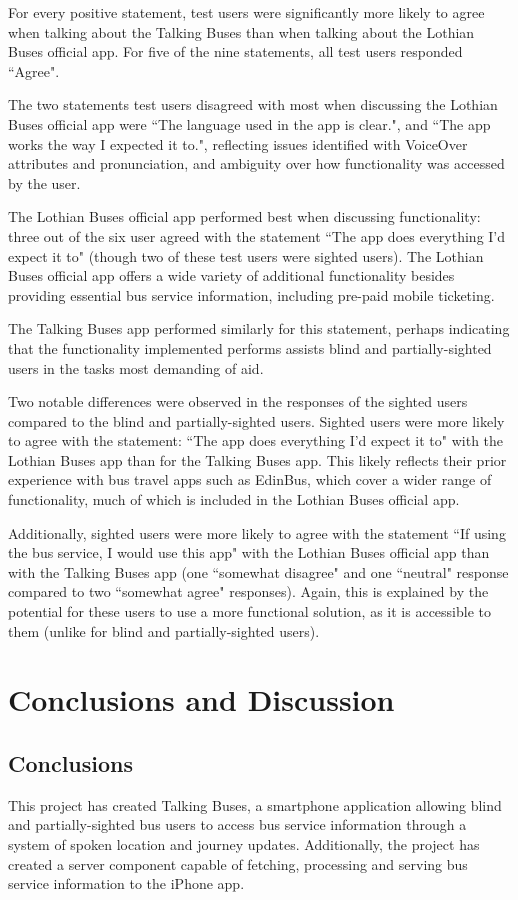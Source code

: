 \documentclass[10pt,twocolumn]{article}
\begin{document}
For every positive statement, test users were significantly more likely to agree when talking about the Talking Buses than when talking about the Lothian Buses official app. For five of the nine statements, all test users responded ``Agree". 

The two statements test users disagreed with most when discussing the Lothian Buses official app were ``The language used in the app is clear.", and ``The app works the way I expected it to.", reflecting issues identified with VoiceOver attributes and pronunciation, and ambiguity over how functionality was accessed by the user.

The Lothian Buses official app performed best when discussing functionality: three out of the six user agreed with the statement ``The app does everything I'd expect it to" (though two of these test users were sighted users). The Lothian Buses official app offers a wide variety of additional functionality besides providing essential bus service information, including pre-paid mobile ticketing.

The Talking Buses app performed similarly for this statement, perhaps indicating that the functionality implemented performs assists blind and partially-sighted users in the tasks most demanding of aid.

Two notable differences were observed in the responses of the sighted users compared to the blind and partially-sighted users. Sighted users were more likely to agree with the statement: ``The app does everything I'd expect it to" with the Lothian Buses app than for the Talking Buses app. This likely reflects their prior experience with bus travel apps such as EdinBus, which cover a wider range of functionality, much of which is included in the Lothian Buses official app.

Additionally, sighted users were more likely to agree with the statement ``If using the bus service, I would use this app" with the Lothian Buses official app than with the Talking Buses app (one ``somewhat disagree" and one ``neutral" response compared to two ``somewhat agree" responses). Again, this is explained by the potential for these users to use a more functional solution, as it is accessible to them (unlike for blind and partially-sighted users).

\section{Conclusions and Discussion}
\subsection{Conclusions}
This project has created Talking Buses, a smartphone application allowing blind and partially-sighted bus users to access bus service information through a system of spoken location and journey updates. Additionally, the project has created a server component capable of fetching, processing and serving bus service information to the iPhone app.
\end{document}
